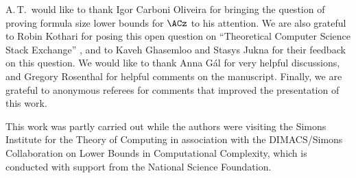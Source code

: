 A.\,T.\ would like to thank Igor Carboni Oliveira for bringing the question
of proving formula size lower bounds for $\ACz$ to his attention.
We are also grateful to Robin Kothari for posing this open question
on ``Theoretical Computer Science Stack Exchange'' \cite{K11},
and to Kaveh Ghasemloo and Stasys Jukna for their feedback on this
question. We would like to thank Anna G{\'{a}}l for very helpful discussions,
and Gregory Rosenthal for helpful comments on the manuscript. Finally,
we are grateful to anonymous referees for comments that improved the
presentation of this work.

This work was partly carried out while the authors were visiting the
Simons Institute for the Theory of Computing in association with the
DIMACS/Simons Collaboration on Lower Bounds in Computational Complexity,
which is conducted with support from the National Science Foundation.


\nocite{conf-version}
